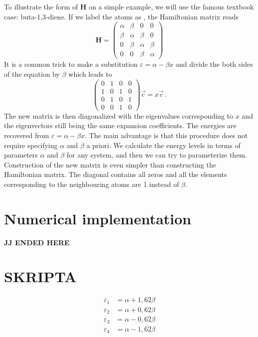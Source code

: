 To illustrate the form of $\mathbf{H}$ on a simple example, we will use the famous textbook case: buta-1,3-diene. If we label the atoms as , the Hamiltonian matrix reads
\begin{equation}
\mathbf{H} = 
\begin{pmatrix}
\alpha & \beta & 0 & 0  \\
\beta &\alpha & \beta & 0  \\
0 &\beta &\alpha & \beta  \\
0 & 0 & \beta &\alpha  
\end{pmatrix}
\label{eq:huckel8}
\end{equation}
It is a common trick to make a substitution $\varepsilon = \alpha - \beta x$ and divide the both sides of the equation by $\beta$ which leads to
\begin{equation}
\begin{pmatrix}
0 & 1 & 0 & 0  \\
1 & 0 & 1 & 0  \\
0 & 1 & 0 & 1  \\
0 & 0 & 1 & 0  
\end{pmatrix}\Vec{c}=x\Vec{c}\, .
\label{eq:huckel9}
\end{equation}
The new matrix is then diagonalized with the eigenvalues corresponding to $x$ and the eigenvectors still being the same expansion coefficients. The energies are recovered from $\varepsilon = \alpha - \beta x$. The main advantage is that this procedure does not require specifying $\alpha$ and $\beta$ a priori. We calculate the energy levels in terms of parameters $\alpha$ and $\beta$ for any system, and then we can try to parameterize them. 
Construction of the new matrix is even simpler than constructing the Hamiltonian matrix. The diagonal contains all zeros and all the elements corresponding to the neighbouring atoms are 1 instead of $\beta$.

\section{Numerical implementation}


\textbf{JJ ENDED HERE}




\vspace{5cm}
\section*{SKRIPTA}

\begin{equation}
\begin{split}
\varepsilon_1 &= \alpha+1{,}62\beta \\
\varepsilon_2 &= \alpha+0{,}62\beta \\
\varepsilon_3 &= \alpha-0{,}62\beta \\
\varepsilon_4 & = \alpha-1{,}62\beta 
\end{split}
\label{rov:HM2}
\end{equation}

